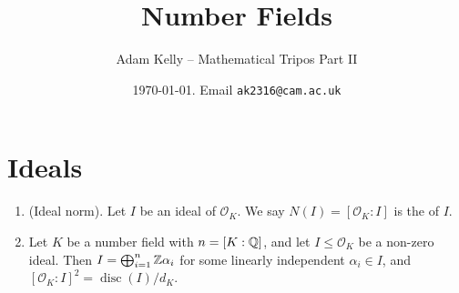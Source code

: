 \documentclass[a4paper, 10pt,]{amsart}
\title{Number Fields}
\author{Adam Kelly -- Mathematical Tripos Part II}
\date{\today. Email \texttt{ak2316@cam.ac.uk}}
\renewcommand{\OO}{\mathcal{O}}
\newcommand{\disc}{\operatorname{disc}}
\begin{document}
\maketitle



\section{Ideals}

\begin{enumerate}
  \item (Ideal norm). Let $I$ be an ideal of $\OO_K$. We say $N(I) = [\OO_K: I]$ is the  of $I$.

  \item Let $K$ be a number field with $n = [K:\mathbb{Q}]$, and let $I \leq \OO_K$ be a non-zero ideal. Then $I = \bigoplus_{i = 1}^n \mathbb{Z} \alpha_i$ for some linearly independent $\alpha_i \in I$, and $[\OO_K: I]^2 = \disc(I)/d_K$. 
\end{enumerate}





\end{document}
